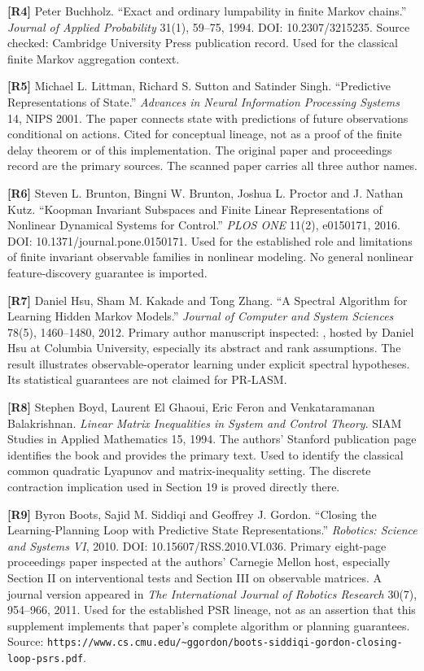 \documentclass[11pt,letterpaper]{article}
\begin{document}
\textbf{{[}R4{]}} Peter Buchholz. ``Exact and ordinary lumpability in
finite Markov chains.'' \emph{Journal of Applied Probability} 31(1),
59--75, 1994. DOI: 10.2307/3215235. Source checked: Cambridge University
Press publication record. Used for the classical finite Markov
aggregation context.

\textbf{{[}R5{]}} Michael L. Littman, Richard S. Sutton and Satinder
Singh. ``Predictive Representations of State.'' \emph{Advances in Neural
Information Processing Systems} 14, NIPS 2001. The paper connects state
with predictions of future observations conditional on actions. Cited
for conceptual lineage, not as a proof of the finite delay theorem or of
this implementation. The original paper and proceedings record are the
primary sources. The scanned paper carries all three author names.

\textbf{{[}R6{]}} Steven L. Brunton, Bingni W. Brunton, Joshua L.
Proctor and J. Nathan Kutz. ``Koopman Invariant Subspaces and Finite
Linear Representations of Nonlinear Dynamical Systems for Control.''
\emph{PLOS ONE} 11(2), e0150171, 2016. DOI:
10.1371/journal.pone.0150171. Used for the established role and
limitations of finite invariant observable families in nonlinear
modeling. No general nonlinear feature-discovery guarantee is imported.

\textbf{{[}R7{]}} Daniel Hsu, Sham M. Kakade and Tong Zhang. ``A
Spectral Algorithm for Learning Hidden Markov Models.'' \emph{Journal of
Computer and System Sciences} 78(5), 1460--1480, 2012. Primary author
manuscript inspected: , hosted by Daniel Hsu at
Columbia University, especially its abstract and rank assumptions. The
result illustrates observable-operator learning under explicit spectral
hypotheses. Its statistical guarantees are not claimed for PR-LASM.

\textbf{{[}R8{]}} Stephen Boyd, Laurent El Ghaoui, Eric Feron and
Venkataramanan Balakrishnan. \emph{Linear Matrix Inequalities in System
and Control Theory}. SIAM Studies in Applied Mathematics 15, 1994. The
authors' Stanford publication page identifies the book and provides the
primary text. Used to identify the classical common quadratic Lyapunov
and matrix-inequality setting. The discrete contraction implication used
in Section 19 is proved directly there.

\textbf{{[}R9{]}} Byron Boots, Sajid M. Siddiqi and Geoffrey J. Gordon.
``Closing the Learning-Planning Loop with Predictive State
Representations.'' \emph{Robotics: Science and Systems VI}, 2010. DOI:
10.15607/RSS.2010.VI.036. Primary eight-page proceedings paper inspected
at the authors' Carnegie Mellon host, especially Section II on
interventional tests and Section III on observable matrices. A journal
version appeared in \emph{The International Journal of Robotics
Research} 30(7), 954--966, 2011. Used for the established PSR lineage,
not as an assertion that this supplement implements that paper's
complete algorithm or planning guarantees. Source:
\texttt{https://www.cs.cmu.edu/\textasciitilde{}ggordon/boots-siddiqi-gordon-closing-loop-psrs.pdf}.
\end{document}
